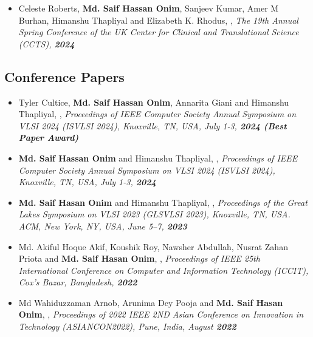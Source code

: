 \documentclass[margin]{res}
\begin{document}
\begin{resume}
\begin{itemize}
\item Celeste Roberts, \textbf{Md. Saif Hassan Onim}, Sanjeev Kumar, Amer M Burhan, Himanshu Thapliyal and Elizabeth K. Rhodus, , \textit{The 19th Annual Spring Conference of the UK Center for Clinical and Translational Science (CCTS), \textbf{2024}}

\end{itemize}
\subsection{Conference Papers}
\begin{itemize}

\item Tyler Cultice, \textbf{Md. Saif Hassan Onim}, Annarita Giani and Himanshu Thapliyal, , \textit{Proceedings of IEEE Computer Society Annual Symposium on VLSI 2024 (ISVLSI 2024), Knoxville, TN, USA, July 1-3, \textbf{2024 (Best Paper Award)}}

\item \textbf{Md. Saif Hassan Onim} and Himanshu Thapliyal, , \textit{Proceedings of IEEE Computer Society Annual Symposium on VLSI 2024 (ISVLSI 2024), Knoxville, TN, USA, July 1-3, \textbf{2024}}

\item \textbf{Md. Saif Hasan Onim} and Himanshu Thapliyal, , \textit{ Proceedings of the Great Lakes Symposium on VLSI 2023 (GLSVLSI 2023), Knoxville, TN, USA. ACM, New York, NY, USA, June 5–7, \textbf{2023}}

\item Md. Akiful Hoque Akif, Koushik Roy, Nawsher Abdullah, Nusrat Zahan Priota and \textbf{Md. Saif Hasan Onim}, , \textit{Proceedings of IEEE 25th International Conference on Computer and Information Technology (ICCIT), Cox’s Bazar, Bangladesh, \textbf{2022}}

\item Md Wahiduzzaman Arnob, Arunima Dey Pooja and \textbf{Md. Saif Hasan Onim}, , \textit{Proceedings of 2022 IEEE 2ND Asian Conference on Innovation in Technology (ASIANCON2022), Pune, India, August \textbf{2022}}


\end{itemize}
\end{resume}
\end{document}

